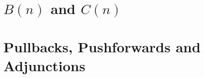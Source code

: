 \documentclass[12pt]{nuthesis}
\theoremstyle{definition}
\theoremstyle{remark}
\theoremstyle{example}
\begin{document}










%


%
%
%
%
%

\clearpage{} %
\tableofcontents	%





\mainmatter             %
%
\chapter{$B(n)$ and $C(n)$}
	
	
	
%
\chapter{Pullbacks, Pushforwards and Adjunctions}
	
	
	
	
	
	
%
\end{document}
